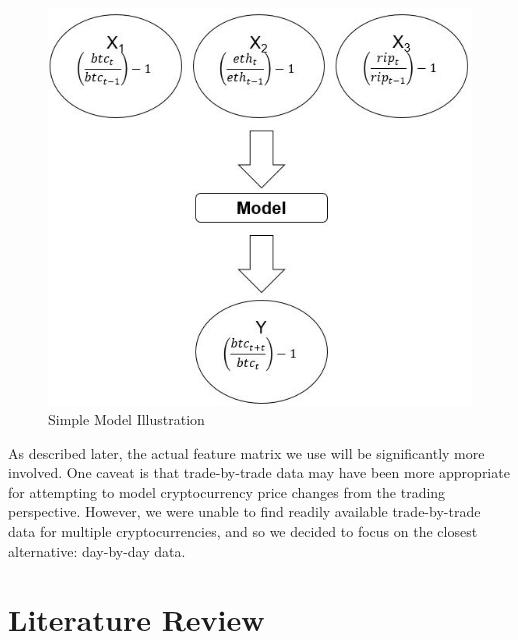 \documentclass[12pt,twoside]{article}
\begin{document}
\begin{figure}[H]
	\begin{center}
		\includegraphics[scale=0.75]{simple_model_graph}
		\caption{Simple Model Illustration}
		\label{fig:simple_model_graph}
	\end{center}
\end{figure}

As described later, the actual feature matrix we use will be significantly more involved. One caveat is that trade-by-trade data may have been more appropriate for attempting to model cryptocurrency price changes from the trading perspective. However, we were unable to find readily available trade-by-trade data for multiple cryptocurrencies, and so we decided to focus on the closest alternative: day-by-day data.

\section{Literature Review}
\end{document}
